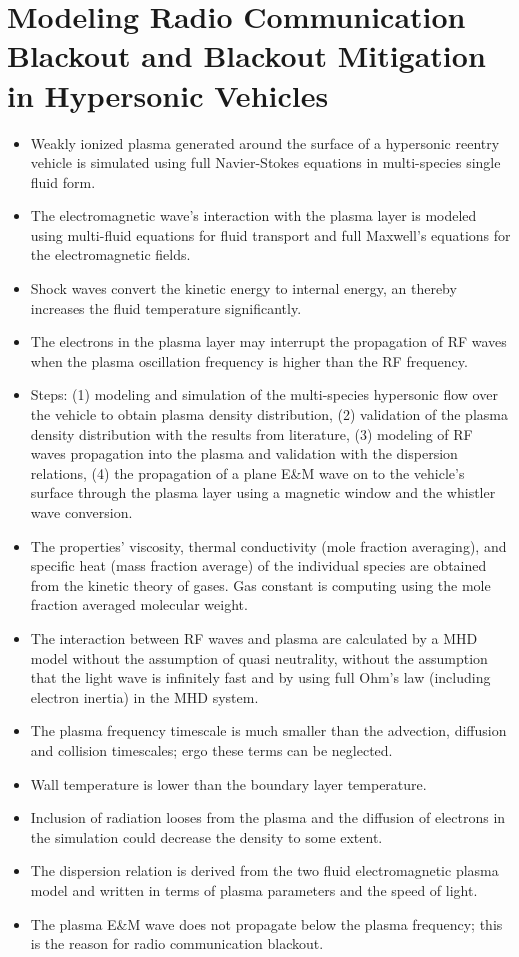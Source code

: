     \section{Modeling Radio Communication Blackout and Blackout Mitigation in Hypersonic Vehicles \cite{kundrapu:jsr:2015}} 
        \begin{itemize} 
            \item Weakly ionized plasma generated around the surface of a hypersonic reentry vehicle is simulated using full Navier-Stokes equations in multi-species single fluid form.
            \item The electromagnetic wave's interaction with the plasma layer is modeled using multi-fluid equations for fluid transport and full Maxwell's equations for the electromagnetic fields. 
            \item Shock waves convert the kinetic energy to internal energy, an thereby increases the fluid temperature significantly.  
            \item The electrons in the plasma layer may interrupt the propagation of RF waves when the plasma oscillation frequency is higher than the RF frequency. 
            \item Steps: (1) modeling and simulation of the multi-species hypersonic flow over the vehicle to obtain plasma density distribution, (2) validation of the plasma density distribution with the results from literature, (3) modeling of RF waves propagation into the plasma and validation with the dispersion relations, (4) the propagation of a plane E\&M wave on to the vehicle's surface through the plasma layer using a magnetic window and the whistler wave conversion.
            \item The properties' viscosity, thermal conductivity (mole fraction averaging), and specific heat (mass fraction average) of the individual species are obtained from the kinetic theory of gases. Gas constant is computing using the mole fraction averaged molecular weight. 
            \item The interaction between RF waves and plasma are calculated by a MHD model without the assumption of quasi neutrality, without the assumption that the light wave is infinitely fast and by using full Ohm's law (including electron inertia) in the MHD system. 
            \item The plasma frequency timescale is much smaller than the advection, diffusion and collision timescales; ergo these terms can be neglected. 
            \item Wall temperature is lower than the boundary layer temperature. 
            \item Inclusion of radiation looses from the plasma and the diffusion of electrons in the simulation could decrease the density to some extent. 
            \item The dispersion relation is derived from the two fluid electromagnetic plasma model and written in terms of plasma parameters and the speed of light.
            \item The plasma E\&M wave does not propagate below the plasma frequency; this is the reason for radio communication blackout.
        \end{itemize}


